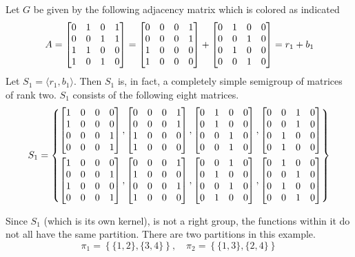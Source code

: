 \begin{example}  	\label{exm:4.2}
Let $G$ be given by the following adjacency matrix which is colored
as indicated
\[
	A = \bmatrix
	   0 &1 &0 &1 \\
	   0 &0 &1 &1 \\
	   1 &1 &0 &0 \\
	   1 &0 &1 &0 \endbmatrix
	=
		\bmatrix
		0 &0 &0 &1 \\
		0 &0 &0 &1 \\
		1 &0 &0 &0 \\
		1 &0 &0 &0 \endbmatrix
	+
		\bmatrix
		0 &1 &0 &0 \\
		0 &0 &1 &0 \\
		0 &1 &0 &0 \\
		0 &0 &1 &0 \endbmatrix = r_1 + b_1
\]
Let $S_1 = \langle r_1,b_1 \rangle$.  Then $S_1$ is, in fact, a completely simple
semigroup of matrices of rank two.  $S_1$ consists of the following eight matrices.
\begin{equation*}
	S_1 = \left \{
		\begin{aligned}
		\bmatrix
		 1 &0 &0 &0 \\
		 1 &0 &0 &0 \\
 		 0 &0 &0 &1 \\
		 0 &0 &0 &1 \endbmatrix, 
		\bmatrix
		 0 &0 &0 &1 \\
		 0 &0 &0 &1 \\
		 1 &0 &0 &0 \\
		 1 &0 &0 &0 \endbmatrix, 
		\bmatrix
		 0 &1 &0 &0 \\
		 0 &1 &0 &0 \\
		 0 &0 &1 &0 \\
		 0 &0 &1 &0 \endbmatrix,
		\bmatrix
		 0 &0 &1 &0 \\
		 0 &0 &1 &0 \\
		 0 &1 &0 &0 \\
		 0 &1 &0 &0 \endbmatrix	\\
		\bmatrix
		1 &0 &0 &0 \\
		0 &0 &0 &1 \\
		1 &0 &0 &0 \\
		0 &0 &0 &1 \endbmatrix,
		\bmatrix
		0 &0 &0 &1 \\
		1 &0 &0 &0 \\
		0 &0 &0 &1 \\
		1 &0 &0 &0 \endbmatrix,
		\bmatrix
		0 &0 &1 &0 \\
		0 &1 &0 &0 \\
		0 &0 &1 &0 \\
		0 &1 &0 &0 \endbmatrix,
		\bmatrix
		0 &1 &0 &0 \\
		0 &0 &1 &0 \\
		0 &1 &0 &0 \\
		0 &0 &1 &0 \endbmatrix
		\end{aligned} 
		\right\}
\end{equation*}

	Since $S_1$ (which is its own kernel), is not a right group, the
functions within it do not all have the same partition.  There are two
partitions in this example.
\[
	\pi_1 = \left\{ \{1,2\}, \{3,4\} \right\}, \quad
		\pi_2 = \left\{ \{1,3\}, \{2,4\} \right\}
\]
\end{example}

